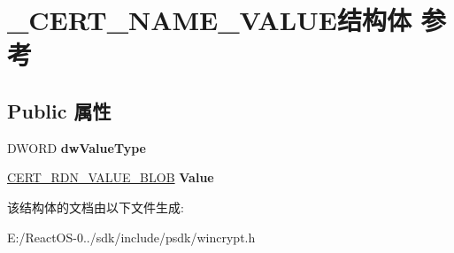 \hypertarget{struct___c_e_r_t___n_a_m_e___v_a_l_u_e}{}\section{\+\_\+\+C\+E\+R\+T\+\_\+\+N\+A\+M\+E\+\_\+\+V\+A\+L\+U\+E结构体 参考}
\label{struct___c_e_r_t___n_a_m_e___v_a_l_u_e}
\subsection*{Public 属性}
\begin{DoxyCompactItemize}
\item 
\mbox{\label{struct___c_e_r_t___n_a_m_e___v_a_l_u_e_a1c6c773308046dc0623d82ea5e43eb6d}} 
D\+W\+O\+RD {\bfseries dw\+Value\+Type}
\item 
\mbox{\label{struct___c_e_r_t___n_a_m_e___v_a_l_u_e_a8248eda125f3474a9dc944035b71f361}} 
\hyperlink{struct___c_r_y_p_t_o_a_p_i___b_l_o_b}{C\+E\+R\+T\+\_\+\+R\+D\+N\+\_\+\+V\+A\+L\+U\+E\+\_\+\+B\+L\+OB} {\bfseries Value}
\end{DoxyCompactItemize}


该结构体的文档由以下文件生成\+:\begin{DoxyCompactItemize}
\item 
E\+:/\+React\+O\+S-\/0../sdk/include/psdk/wincrypt.\+h\end{DoxyCompactItemize}
